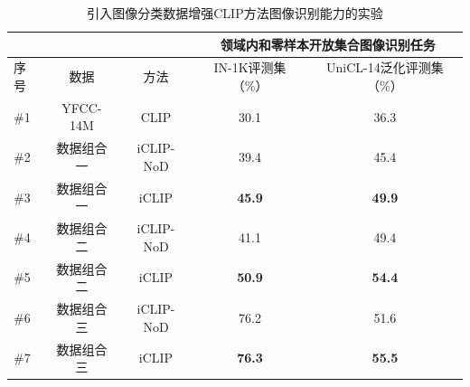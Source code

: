 \begin{table}
    \centering
    \caption{引入图像分类数据增强CLIP方法图像识别能力的实验}
    \begin{tabular}{lcccc}
    \toprule
        \multicolumn{1}{c}{} &
        \multicolumn{1}{c}{} & \multicolumn{1}{c}{} & \multicolumn{2}{c}{领域内和零样本开放集合图像识别任务} \\
        \midrule
        序号 & 数据 & 方法 & IN-1K评测集（\%） & UniCL-14泛化评测集（\%）  \\
        \midrule
        \#1 & YFCC-14M & CLIP & 30.1 & 36.3 \\

        \#2 & 数据组合一 & iCLIP-NoD & 39.4 & 45.4 \\  
                
        \#3 & 数据组合一 & iCLIP & \textbf{45.9} & \textbf{49.9} \\    
        
        \midrule
        
        \#4 & 数据组合二 & iCLIP-NoD & 41.1 & 49.4  \\  
                
        \#5 & 数据组合二 & iCLIP & \textbf{50.9} & \textbf{54.4} \\   
        
        \midrule        
        
        \#6 & 数据组合三 & iCLIP-NoD & 76.2 & 51.6 \\
        
        \#7 & 数据组合三 & iCLIP & \textbf{76.3} & \textbf{55.5} \\

        \bottomrule
    \end{tabular}
    \label{tab:iclip-ablate_yfcc}
\end{table}

